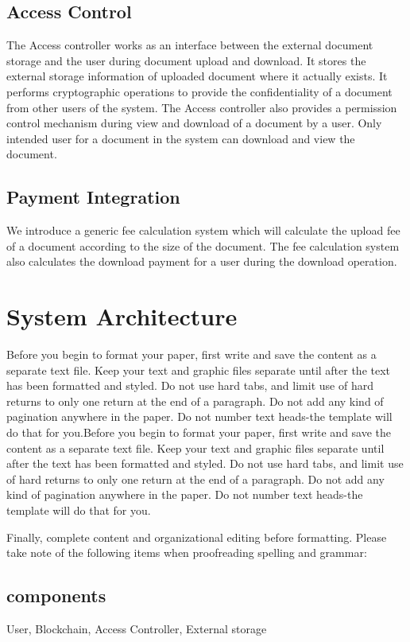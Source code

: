 \documentclass[letterpaper, 10 pt, conference]{ieeeconf}  %
\begin{document}
\subsection{Access Control}

The Access controller works as an interface between the external document storage and the user during document upload and download. It stores the external storage information of uploaded document where it actually exists. It performs cryptographic operations to provide the confidentiality of a document from other users of the system.
The Access controller also provides a permission control mechanism during view and download of a document by a user. Only intended user for a document in the system can download and view the document.

\subsection{Payment Integration}

We introduce a generic fee calculation system which will calculate the upload fee of a document according to the size of the document. The fee calculation system also calculates the download payment for a user during the download operation.

\section{System Architecture}

Before you begin to format your paper, first write and save the content as a separate text file. Keep your text and graphic files separate until after the text has been formatted and styled. Do not use hard tabs, and limit use of hard returns to only one return at the end of a paragraph. Do not add any kind of pagination anywhere in the paper. Do not number text heads-the template will do that for you.Before you begin to format your paper, first write and save the content as a separate text file. Keep your text and graphic files separate until after the text has been formatted and styled. Do not use hard tabs, and limit use of hard returns to only one return at the end of a paragraph. Do not add any kind of pagination anywhere in the paper. Do not number text heads-the template will do that for you.

Finally, complete content and organizational editing before formatting. Please take note of the following items when proofreading spelling and grammar:

\subsection{components} 
User, Blockchain, Access Controller, External storage
\end{document}
